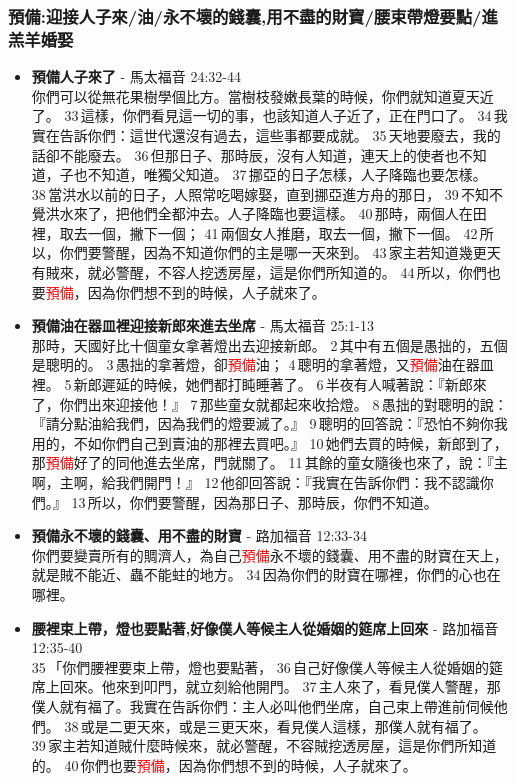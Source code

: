 \subsubsection{預備:迎接人子來/油/永不壞的錢囊,用不盡的財寶/腰束帶燈要點/進羔羊婚娶}
\begin{itemize}
\item \textbf{預備人子來了} - 馬太福音 24:32-44\\
你們可以從無花果樹學個比方。當樹枝發嫩長葉的時候，你們就知道夏天近了。 33 這樣，你們看見這一切的事，也該知道人子近了，正在門口了。 34 我實在告訴你們：這世代還沒有過去，這些事都要成就。 35 天地要廢去，我的話卻不能廢去。 36 但那日子、那時辰，沒有人知道，連天上的使者也不知道，子也不知道，唯獨父知道。 37 挪亞的日子怎樣，人子降臨也要怎樣。 38 當洪水以前的日子，人照常吃喝嫁娶，直到挪亞進方舟的那日， 39 不知不覺洪水來了，把他們全都沖去。人子降臨也要這樣。 40 那時，兩個人在田裡，取去一個，撇下一個； 41 兩個女人推磨，取去一個，撇下一個。 42 所以，你們要警醒，因為不知道你們的主是哪一天來到。 43 家主若知道幾更天有賊來，就必警醒，不容人挖透房屋，這是你們所知道的。 44 所以，你們也要\textcolor{red}{預備}，因為你們想不到的時候，人子就來了。
\item \textbf{預備油在器皿裡迎接新郎來進去坐席} - 馬太福音 25:1-13\\
那時，天國好比十個童女拿著燈出去迎接新郎。 2 其中有五個是愚拙的，五個是聰明的。 3 愚拙的拿著燈，卻\textcolor{red}{預備}油； 4 聰明的拿著燈，又\textcolor{red}{預備}油在器皿裡。 5 新郎遲延的時候，她們都打盹睡著了。 6 半夜有人喊著說：『新郎來了，你們出來迎接他！』 7 那些童女就都起來收拾燈。 8 愚拙的對聰明的說：『請分點油給我們，因為我們的燈要滅了。』 9 聰明的回答說：『恐怕不夠你我用的，不如你們自己到賣油的那裡去買吧。』 10 她們去買的時候，新郎到了，那\textcolor{red}{預備}好了的同他進去坐席，門就關了。 11 其餘的童女隨後也來了，說：『主啊，主啊，給我們開門！』 12 他卻回答說：『我實在告訴你們：我不認識你們。』 13 所以，你們要警醒，因為那日子、那時辰，你們不知道。
\item \textbf{預備永不壞的錢囊、用不盡的財寶} - 路加福音 12:33-34\\
你們要變賣所有的賙濟人，為自己\textcolor{red}{預備}永不壞的錢囊、用不盡的財寶在天上，就是賊不能近、蟲不能蛀的地方。 34 因為你們的財寶在哪裡，你們的心也在哪裡。

\item \textbf{腰裡束上帶，燈也要點著,好像僕人等候主人從婚姻的筵席上回來} - 路加福音 12:35-40\\
35 「你們腰裡要束上帶，燈也要點著， 36 自己好像僕人等候主人從婚姻的筵席上回來。他來到叩門，就立刻給他開門。 37 主人來了，看見僕人警醒，那僕人就有福了。我實在告訴你們：主人必叫他們坐席，自己束上帶進前伺候他們。 38 或是二更天來，或是三更天來，看見僕人這樣，那僕人就有福了。 39 家主若知道賊什麼時候來，就必警醒，不容賊挖透房屋，這是你們所知道的。 40 你們也要\textcolor{red}{預備}，因為你們想不到的時候，人子就來了。


\end{itemize}
